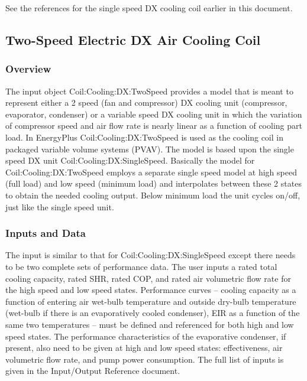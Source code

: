 See the references for the single speed DX cooling coil earlier in this document.

\subsection{Two-Speed Electric DX Air Cooling Coil}\label{two-speed-electric-dx-air-cooling-coil}

\subsubsection{Overview}\label{overview-3-003}

The input object Coil:Cooling:DX:TwoSpeed provides a model that is meant to represent either a 2 speed (fan and compressor) DX cooling unit (compressor, evaporator, condenser) or a variable speed DX cooling unit in which the variation of compressor speed and air flow rate is nearly linear as a function of cooling part load. In EnergyPlus Coil:Cooling:DX:TwoSpeed is used as the cooling coil in packaged variable volume systems (PVAV). The model is based upon the single speed DX unit Coil:Cooling:DX:SingleSpeed. Basically the model for Coil:Cooling:DX:TwoSpeed employs a separate single speed model at high speed (full load) and low speed (minimum load) and interpolates between these 2 states to obtain the needed cooling output. Below minimum load the unit cycles on/off, just like the single speed unit.

\subsubsection{Inputs and Data}\label{inputs-and-data-001}

The input is similar to that for Coil:Cooling:DX:SingleSpeed except there needs to be two complete sets of performance data. The user inputs a rated total cooling capacity, rated SHR, rated COP, and rated air volumetric flow rate for the high speed and low speed states. Performance curves -- cooling capacity as a function of entering air wet-bulb temperature and outside dry-bulb temperature (wet-bulb if there is an evaporatively cooled condenser), EIR as a function of the same two temperatures -- must be defined and referenced for both high and low speed states. The performance characteristics of the evaporative condenser, if present, also need to be given at high and low speed states: effectiveness, air volumetric flow rate, and pump power consumption. The full list of inputs is given in the Input/Output Reference document.


